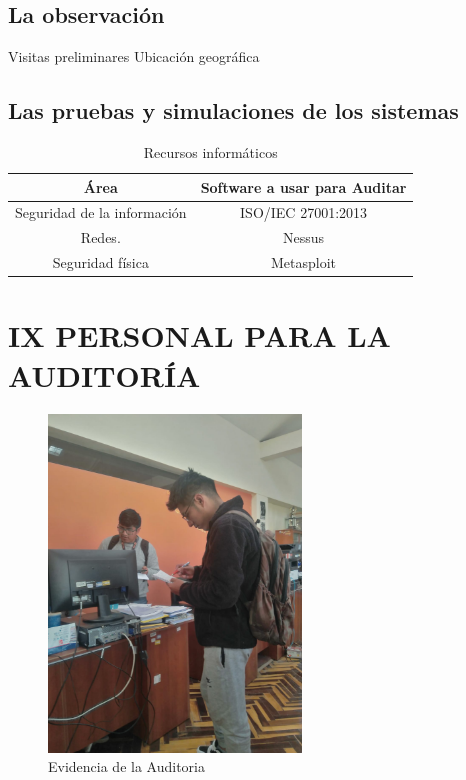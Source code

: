 \documentclass[12pt,a4paper]{article}
\begin{document}
\subsection{La observación}
Visitas preliminares
Ubicación geográfica 
\subsection{Las pruebas y simulaciones de los sistemas}

\begin{table}[ht]
    \centering
    \caption{Recursos informáticos }
    \begin{tabular}{cc}
        \toprule
        Área & Software a usar para Auditar \\
        \midrule
        Seguridad de la información  & ISO/IEC 27001:2013 \\
        Redes.  & Nessus\\
        Seguridad física & Metasploit \\        \bottomrule
    \end{tabular}
    
\end{table}

\newpage
\section{IX PERSONAL PARA LA AUDITORÍA}
\begin{figure}[!htb]
    \centering
    \includegraphics[width=0.6\textwidth]{images/evidencia.jpeg}
    \caption{Evidencia de la Auditoria}
    
\end{figure}
\end{document}
